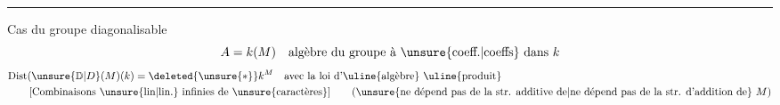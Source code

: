 \begin{center}\rule{1.6cm}{0.55pt}\end{center}
Cas du groupe diagonalisable
\[
 A=k(M)\quad\text{algèbre du groupe à \unsure{coeff.|coeffs} dans } k
\]
\[
\begin{aligned}
 &\mathrm{Dist}(\unsure{\mathbb D|D}(M)(k)=\deleted{\unsure{*}}k^{M}\quad\text{avec la loi d'\uline{algèbre} \uline{produit}}\\
 &\qquad\text{[Combinaisons \unsure{lin|lin.} infinies de \unsure{caractères}]} \qquad
 \text{(\unsure{ne dépend pas de la str. additive de|ne dépend pas de la str. d'addition de} $M$)}
\end{aligned}
\]
